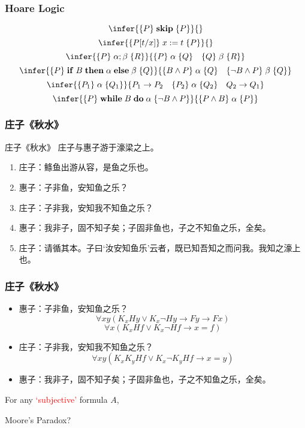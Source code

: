 \documentclass[UTF8,aspectratio=43,11pt,colorlinks,compress,openany]{beamer}%
\begin{document}
\begin{frame}\frametitle{Hoare Logic}
\[\infer{\{P\} \;\mathbf{skip}\; \{P\}}{}\]
\[\infer{\{P[t/x]\}\; x:=t\; \{P\}}{}\]
\[\infer{\{P\}\; \alpha;\beta\; \{R\}}{\{P\}\;\alpha\;\{Q\}\quad\{Q\}\;\beta\;\{R\}}\]
\[\infer{\{P\} \;\mathbf{if}\; B \;\mathbf{then}\; \alpha \;\mathbf{else}\; \beta\; \{Q\}}{\{B\wedge P\}\;\alpha\;\{Q\}\quad\{\neg B\wedge P\}\;\beta\;\{Q\}}\]
\[\infer{\{P_1\}\;\alpha\;\{Q_1\}}{P_1\to P_2\quad \{P_2\}\;\alpha\;\{Q_2\}\quad Q_2\to Q_1}\]
\[\infer{\{P\} \;\mathbf{while}\; B \;\mathbf{do}\; \alpha\; \{\neg B\wedge P\}}{\{P\wedge B\}\; \alpha\; \{P\}}\]
\end{frame}

\begin{frame}\frametitle{庄子《秋水》}
\begin{block}{庄子《秋水》}
庄子与惠子游于濠梁之上。
\begin{enumerate}
		\item 庄子：鲦鱼出游从容，是鱼之乐也。
		\item 惠子：子非鱼，安知鱼之乐？
		\item 庄子：子非我，安知我不知鱼之乐？
		\item 惠子：我非子，固不知子矣；子固非鱼也，子之不知鱼之乐，全矣。
		\item 庄子：请循其本。子曰‘汝安知鱼乐’云者，既已知吾知之而问我。我知之濠上也。
\end{enumerate}
\end{block}
\end{frame}

\begin{frame}\frametitle{庄子《秋水》}
\begin{itemize}
\item 惠子：子非鱼，安知鱼之乐？
\[\forall xy(K_xHy\vee K_x\neg Hy\to Fy\to Fx)\]
\[\forall x(K_xHf\vee K_x\neg Hf\to x=f)\]
\item 庄子：子非我，安知我不知鱼之乐？
\[\forall xy(K_x K_yHf\vee K_x\neg K_y Hf\to x=y)\]
\item 惠子：我非子，固不知子矣；子固非鱼也，子之不知鱼之乐，全矣。
\end{itemize}
\begin{block}{}
For any \textcolor{red}{`subjective'} formula $A$,\\
\centerline{\hfill Moore's Paradox?}
\end{block}
\end{frame}
\end{document}

